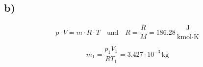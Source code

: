 

\subsection*{b)}
\[
p \cdot V = m \cdot R \cdot T \quad \text{und} \quad R = \frac{\bar{R}}{M} = 186.28 \, \frac{\text{J}}{\text{kmol} \cdot \text{K}}
\]

\[
m_1 = \frac{p_1 V_1}{R T_1} = 3.427 \cdot 10^{-3} \, \text{kg}
\]